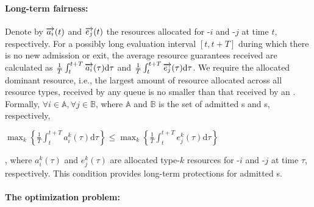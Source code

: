 \paragraph{Long-term fairness:}
Denote by $\protect\overrightarrow{a_i}(t)$ and $\protect\overrightarrow{e_j}(t)$ the resources allocated for {\burstq}-$i$ and {\batchq}-$j$ at time $t$, respectively.
For a possibly long evaluation interval $[t, t+T]$ during which there is no new admission or exit, the average resource guarantees received are calculated as $\frac{1}{T}\int_t^{t+T} \protect\overrightarrow{a_i}(\tau)\text{d}\tau$ and $\frac{1}{T}\int_t^{t+T} \protect\overrightarrow{e_j}(\tau)\text{d}\tau$.
We require the allocated dominant resource, i.e., the largest amount of resource allocated across all resource types, received by any {\batchq} queue is no smaller than that received by an {\burstq}. Formally, $\forall i\in\mathbb{A}, \forall j\in\mathbb{B}$, where $\mathbb{A}$ and $\mathbb{B}$ is the set of admitted {\burstq}s and {\batchq}s, respectively, 
\begin{small}$\max_{k}\left\{\frac{1}{T}\int_t^{t+T} a_i^k(\tau)\text{d}\tau\right\}\leq\max_{k}\left\{\frac{1}{T}\int_t^{t+T} e_j^k(\tau)\text{d}\tau\right\}$\end{small}, 
where $a_i^k(\tau)$ and $e_j^k(\tau)$ are allocated type-$k$ resources for {\burstq}-$i$ and {\batchq}-$j$ at time $\tau$, respectively.
This condition provides long-term protections for admitted {\batchq}s.

%

\paragraph{The optimization problem:}

